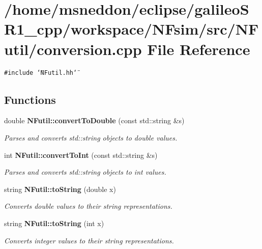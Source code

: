 \section{/home/msneddon/eclipse/galileoSR1\_\-cpp/workspace/NFsim/src/NFutil/conversion.cpp File Reference}
\label{conversion_8cpp}


{\tt \#include \char`\"{}NFutil.hh\char`\"{}}\par
\subsection*{Functions}
\begin{CompactItemize}
\item 
double {\bf NFutil::convertToDouble} (const std::string \&s)
\begin{CompactList}\small\item\em Parses and converts std::string objects to double values. \item\end{CompactList}\item 
int {\bf NFutil::convertToInt} (const std::string \&s)
\begin{CompactList}\small\item\em Parses and converts std::string objects to int values. \item\end{CompactList}\item 
string {\bf NFutil::toString} (double x)
\begin{CompactList}\small\item\em Converts double values to their string representations. \item\end{CompactList}\item 
string {\bf NFutil::toString} (int x)
\begin{CompactList}\small\item\em Converts integer values to their string representations. \item\end{CompactList}\end{CompactItemize}
